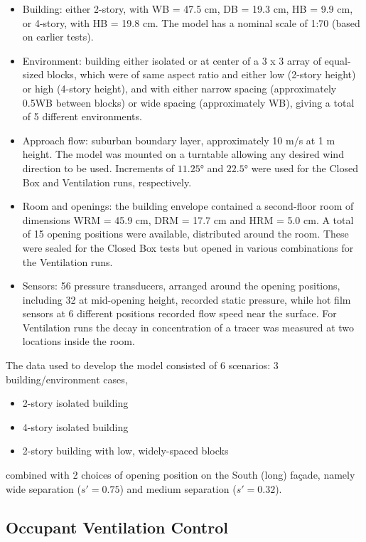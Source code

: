 \begin{itemize}
\item Building: either 2-story, with WB = 47.5 cm, DB = 19.3 cm, HB = 9.9 cm, or 4-story, with HB = 19.8 cm. The model has a nominal scale of 1:70 (based on earlier tests).
\item Environment: building either isolated or at center of a 3 x 3 array of equal-sized blocks, which were of same aspect ratio and either low (2-story height) or high (4-story height), and with either narrow spacing (approximately 0.5WB between blocks) or wide spacing (approximately WB), giving a total of 5 different environments.
\item Approach flow: suburban boundary layer, approximately 10 m/s at 1 m height. The model was mounted on a turntable allowing any desired wind direction to be used. Increments of $\ang{11.25}$ and $\ang{22.5}$ were used for the Closed Box and Ventilation runs, respectively.
\item Room and openings: the building envelope contained a second-floor room of dimensions WRM = 45.9 cm, DRM = 17.7 cm and HRM = 5.0 cm. A total of 15 opening positions were available, distributed around the room. These were sealed for the Closed Box tests but opened in various combinations for the Ventilation runs. 
\item Sensors: 56 pressure transducers, arranged around the opening positions, including 32 at mid-opening height, recorded static pressure, while hot film sensors at 6 different positions recorded flow speed near the surface. For Ventilation runs the decay in concentration of a tracer was measured at two locations inside the room.
\end{itemize}

The data used to develop the model consisted of 6 scenarios: 3 building/environment cases,
\begin{itemize}
\item 2-story isolated building
\item 4-story isolated building
\item 2-story building with low, widely-spaced blocks
\end{itemize}
combined with 2 choices of opening position on the South (long) fa\c{c}ade, namely wide separation ($s' = 0.75$) and medium separation ($s' = 0.32$). 

\subsection{Occupant Ventilation Control}\label{occupant-ventilation-control}


